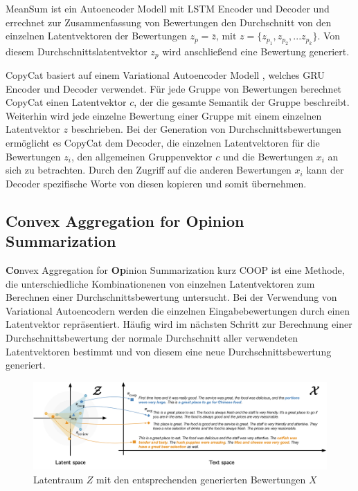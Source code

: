 MeanSum ist ein Autoencoder Modell \citep{meansum} mit LSTM Encoder und Decoder und errechnet zur Zusammenfassung von Bewertungen den Durchschnitt von den einzelnen Latentvektoren der Bewertungen $z_p = \bar{z} \text{, mit } z=\{z_{p_1},z_{p_2},...z_{p_k}\}$.
Von diesem Durchschnittslatentvektor $z_p$ wird anschließend eine Bewertung generiert. 


CopyCat basiert auf einem Variational Autoencoder Modell \citep{copycat}, welches GRU Encoder und Decoder verwendet. 
Für jede Gruppe von Bewertungen berechnet CopyCat einen Latentvektor $c$, der die gesamte Semantik der Gruppe beschreibt. 
Weiterhin wird jede einzelne Bewertung einer Gruppe mit einem einzelnen Latentvektor $z$ beschrieben.
Bei der Generation von Durchschnittsbewertungen ermöglicht es CopyCat dem Decoder, die einzelnen Latentvektoren für die Bewertungen $z_i$, den allgemeinen Gruppenvektor $c$ und die Bewertungen $x_i$ an sich zu betrachten.
Durch den Zugriff auf die anderen Bewertungen $x_i$ kann der Decoder spezifische Worte von diesen \glqq kopieren\grqq{}  und somit übernehmen.



\subsection{Convex Aggregation for Opinion Summarization}
\label{coop}
\textbf{Co}nvex Aggregation for \textbf{Op}inion Summarization kurz COOP \citep{coop} ist eine Methode, die unterschiedliche Kombinationenen von einzelnen Latentvektoren zum Berechnen einer Durchschnittsbewertung untersucht.
Bei der Verwendung von Variational Autoencodern werden die einzelnen Eingabebewertungen durch einen Latentvektor repräsentiert. 
Häufig wird im nächsten Schritt zur Berechnung einer Durchschnittsbewertung der normale Durchschnitt aller verwendeten Latentvektoren bestimmt und von diesem eine neue Durchschnittsbewertung generiert.

\begin{figure}[h]
    \centering
    \includegraphics[width=\textwidth]{bilder/coop}
    \caption{Latentraum $Z$ mit den entsprechenden generierten Bewertungen $X$ \citep{coop}}
    \label{coop_fig}
\end{figure}

